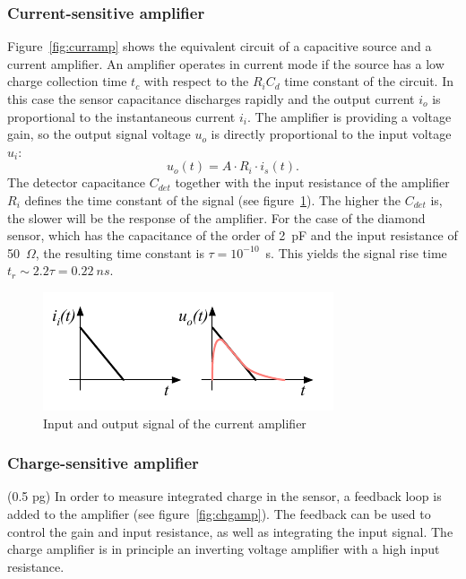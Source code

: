 \documentclass[twoside,12pt]{packages/mytustyle}  %
\begin{document}
\subsubsection{Current-sensitive amplifier}
Figure~\ref{fig:curramp} shows the equivalent circuit of a capacitive source and a current amplifier. An amplifier operates in current mode if the source has a low charge collection time $t_c$ with respect to the $R_iC_d$ time constant of the circuit. In this case the sensor capacitance discharges rapidly and the output current $i_o$ is proportional to the instantaneous current $i_i$. The amplifier is providing a voltage gain, so the output signal voltage $u_o$ is directly proportional to the input voltage $u_i$:
\begin{equation}
u_o(t) = A \cdot R_i \cdot i_s(t).
\end{equation}
The detector capacitance $C_{det}$ together with the input resistance of the amplifier $R_i$ defines the time constant of the signal (see figure~\ref{fig:currc}). The higher the $C_{det}$ is, the slower will be the response of the amplifier. For the case of the diamond sensor, which has the capacitance of the order of 2~pF and the input resistance of 50~$\Omega$, the resulting time constant is $\tau=10^{-10}$~s. This yields the signal rise time $t_r\sim2.2\tau=0.22~ns$.
\begin{figure}[!t]
\begin{center}
\includegraphics[width=0.45\linewidth]{plots/currrc}
\caption{Input and output signal of the current amplifier}
\label{fig:currc}
\end{center}
\end{figure}




\subsubsection{Charge-sensitive amplifier}
(0.5 pg)
In order to measure integrated charge in the sensor, a feedback loop is added to the amplifier (see figure~\ref{fig:chgamp}). The feedback can be used to control the gain and input resistance, as well as integrating the input signal. The charge amplifier is in principle an inverting voltage amplifier with a high input resistance. 
 
\end{document}
